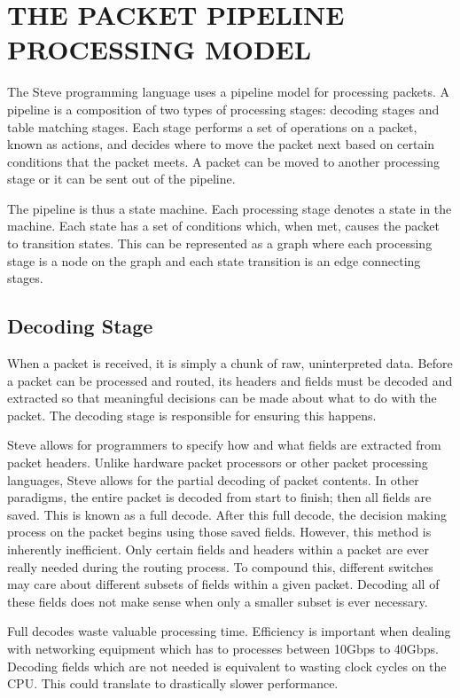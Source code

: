 \chapter{THE PACKET PIPELINE PROCESSING MODEL} \label{pipeline_model}

The Steve programming language uses a pipeline model for processing packets. A pipeline is a composition of two types of processing stages: decoding stages and table matching stages. Each stage performs a set of operations on a packet, known as actions, and decides where to move the packet next based on certain conditions that the packet meets. A packet can be moved to another processing stage or it can be sent out of the pipeline.

The pipeline is thus a state machine. Each processing stage denotes a state in the machine. Each state has a set of conditions which, when met, causes the packet to transition states. This can be represented as a graph where each processing stage is a node on the graph and each state transition is an edge connecting stages.

\section{Decoding Stage}

When a packet is received, it is simply a chunk of raw, uninterpreted data. Before a packet can be processed and routed, its headers and fields must be decoded and extracted so that meaningful decisions can be made about what to do with the packet. The decoding stage is responsible for ensuring this happens.

Steve allows for programmers to specify how and what fields are extracted from packet headers. Unlike hardware packet processors or other packet processing languages, Steve allows for the partial decoding of packet contents. In other paradigms, the entire packet is decoded from start to finish; then all fields are saved. This is known as a full decode. After this full decode, the decision making process on the packet begins using those saved fields. However, this method is inherently inefficient. Only certain fields and headers within a packet are ever really needed during the routing process. To compound this, different switches may care about different subsets of fields within a given packet. Decoding all of these fields does not make sense when only a smaller subset is ever necessary. 

Full decodes waste valuable processing time. Efficiency is important when dealing with networking equipment which has to processes between 10Gbps to 40Gbps. Decoding fields which are not needed is equivalent to wasting clock cycles on the CPU. This could translate to drastically slower performance.

